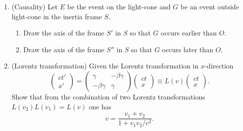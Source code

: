 \documentclass[12pt]{article}%
\begin{document}
\begin{enumerate}

\item (Causality)
Let $E$ be the event on the light-cone and $G$ be an event outside light-cone in the inertia frame $S$.
	\begin{enumerate}
	\item Draw the axis of the frame $S'$ in $S$ so that $G$ occurs earlier than $O$.
	\item Draw the axis of the frame $S''$ in $S$ so that $G$ occurs later than $O$.	\end{enumerate}

\noindent{}

\newpage
\item (Lorentz transformation) Given the Lorentz transformation in $x$-direction
\begin{equation*}
\begin{pmatrix}ct'\\x'\end{pmatrix}
= 
\begin{pmatrix}\gamma&-\beta\gamma\\-\beta\gamma&\gamma\end{pmatrix}
\begin{pmatrix}ct\\x\end{pmatrix}
\equiv L(v)\begin{pmatrix}ct\\x\end{pmatrix}.
\end{equation*}
Show that from the combination of two Lorentz transformations $L(v_2)L(v_1) = L(v)$ one has
\begin{equation*}
v = \frac{v_1+v_2}{1+v_1v_2/c^2}.
\end{equation*}

\noindent{}
\end{enumerate}
\end{document}
